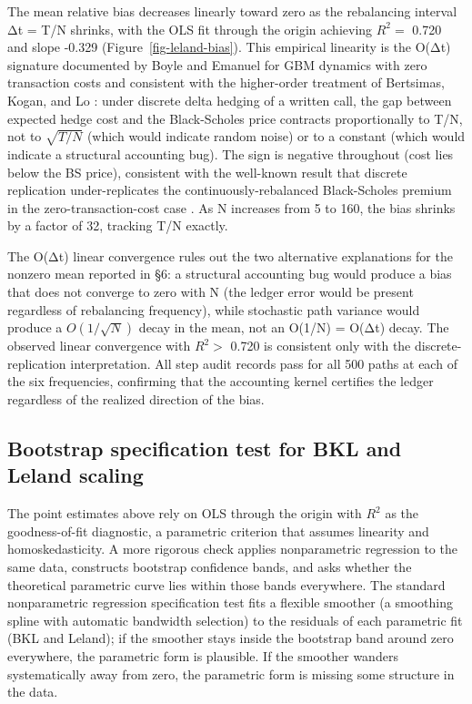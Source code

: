 \documentclass[
  11pt,
  letterpaper,
  DIV=12,
  numbers=noendperiod]{scrartcl}
\numberwithin{equation}{section}
\numberwithin{figure}{section}
\numberwithin{table}{section}
\begin{document}
The mean relative bias decreases linearly toward zero as the rebalancing
interval Δt = T/N shrinks, with the OLS fit through the origin achieving
\(R^2 =\) 0.720 and slope -0.329 (Figure~\ref{fig-leland-bias}). This
empirical linearity is the O(Δt) signature documented by Boyle and
Emanuel  for GBM dynamics with zero
transaction costs and consistent with the higher-order treatment of
Bertsimas, Kogan, and Lo : under
discrete delta hedging of a written call, the gap between expected hedge
cost and the Black-Scholes price contracts proportionally to T/N, not to
\(\sqrt{T/N}\) (which would indicate random noise) or to a constant
(which would indicate a structural accounting bug). The sign is negative
throughout (cost lies below the BS price), consistent with the
well-known result that discrete replication under-replicates the
continuously-rebalanced Black-Scholes premium in the
zero-transaction-cost case . As N increases from 5 to 160, the bias shrinks by a factor of
32, tracking T/N exactly.

The O(Δt) linear convergence rules out the two alternative explanations
for the nonzero mean reported in §6: a structural accounting bug would
produce a bias that does not converge to zero with N (the ledger error
would be present regardless of rebalancing frequency), while stochastic
path variance would produce a \(O(1/\sqrt{N})\) decay in the mean, not
an O(1/N) = O(Δt) decay. The observed linear convergence with \(R^2 >\)
0.720 is consistent only with the discrete-replication interpretation.
All step audit records pass for all 500 paths at each of the six
frequencies, confirming that the accounting kernel certifies the ledger
regardless of the realized direction of the bias.

\subsection{Bootstrap specification test for BKL and Leland
scaling}\label{sec-bootstrap}

The point estimates above rely on OLS through the origin with \(R^2\) as
the goodness-of-fit diagnostic, a parametric criterion that assumes
linearity and homoskedasticity. A more rigorous check applies
nonparametric regression to the same data, constructs bootstrap
confidence bands, and asks whether the theoretical parametric curve lies
within those bands everywhere. The standard nonparametric regression
specification test  fits a
flexible smoother (a smoothing spline with automatic bandwidth
selection) to the residuals of each parametric fit (BKL and Leland); if
the smoother stays inside the bootstrap band around zero everywhere, the
parametric form is plausible. If the smoother wanders systematically
away from zero, the parametric form is missing some structure in the
data.
\end{document}

